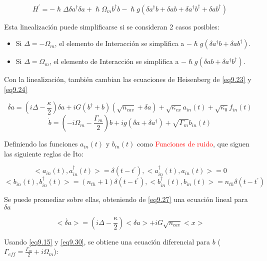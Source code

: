 \documentclass{book}
\begin{document}
\begin{equation}\label{eq9.26}H^\prime=-\hslash\Delta \delta a^\dag \delta a +\hslash \Omega_m b^\dag b -\hslash g (\delta a^\dag b+ \delta ab+\delta a^\dag b^\dag + \delta a b^\dag) \end{equation}

Esta linealización puede simplificarse si se consideran 2 casos posibles:

\begin{itemize}
    \item Si $\Delta=-\Omega_m$, el elemento de Interacción se simplifica a $-\hslash g(\delta a^\dag b+ \delta a b^\dag)$.
    \item Si $\Delta=\Omega_m$, el elemento de Interacción se simplifica a $-\hslash g(\delta ab+\delta a^\dag b^\dag)$.
\end{itemize}

Con la linealización, también cambian las ecuaciones de Heisenberg de \ref{eq9.23} y \ref{eq9.24}

\begin{equation}\label{eq9.27}\dot{\delta a}=(i\Delta-\frac{\kappa}{2})\delta a+iG(b^\dag+b)(\sqrt{n_{cav}}+\delta a)+\sqrt{\kappa_{ex}}a_{in}(t)+\sqrt{\kappa_0}f_{in}(t)\end{equation}
\begin{equation}\label{eq9.28}\dot{b}=(-i\Omega_m-\frac{\Gamma_m}{2})b+ig(\delta a+\delta a^\dag)+\sqrt{\Gamma_m}b_{in}(t)\end{equation}

Definiendo las funciones $a_{in}(t)$ y $b_{in}(t)$ como \textcolor{red}{Funciones de ruido}, que siguen las siguiente reglas de Ito:

\begin{equation}\label{eq9.29}<a_{in}(t),a^\dag_{in}(t)>=\delta(t-t^\prime),<a^\dag_{in}(t),a_{in}(t)>=0 \end{equation}
\begin{equation}\label{eq9.30}<b_{in}(t),b^\dag_{in}(t)>=(n_{th}+1)\delta(t-t^\prime),<b^\dag_{in}(t),b_{in}(t)>=n_{th}\delta(t-t^\prime)\end{equation}

Se puede promediar sobre ellas, obteniendo de \ref{eq9.27} una ecuación lineal para $\delta a$

\begin{equation}\label{eq9.31}<\dot{\delta a}>=(i\Delta-\frac{\kappa}{2})<\delta a>+iG\sqrt{n_{cav}}<x> \end{equation}

Usando \ref{eq9.15} y \ref{eq9.30}, se obtiene una ecuación diferencial para $b$ ($\Gamma_{eff}=\frac{\Gamma_m}{2}+i\Omega_m$):
\end{document}
